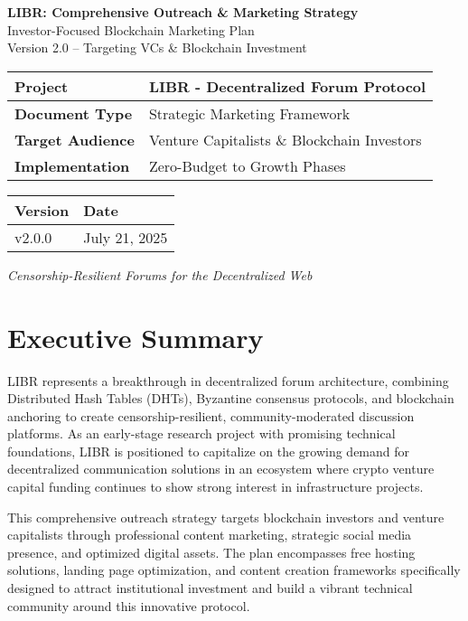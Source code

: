 \documentclass[12pt,a4paper]{article}
\begin{document}
\begin{titlepage}
\centering
\vspace*{2cm}
{\Huge\textbf{LIBR: Comprehensive Outreach \& Marketing Strategy}}\\[0.5cm]
{\Large Investor-Focused Blockchain Marketing Plan}\\[1cm]
{\large Version 2.0 -- Targeting VCs \& Blockchain Investment}\\[2cm]

\begin{tabular}{|l|l|}
\hline
\textbf{Project} & LIBR - Decentralized Forum Protocol \\
\hline
\textbf{Document Type} & Strategic Marketing Framework \\
\hline
\textbf{Target Audience} & Venture Capitalists \& Blockchain Investors \\
\hline
\textbf{Implementation} & Zero-Budget to Growth Phases \\
\hline
\end{tabular}

\vspace{10mm}

\begin{tabular}{|l|l|}
\hline
\textbf{Version} & \textbf{Date} \\
\hline
v2.0.0 & July 21, 2025 \\
\hline
\end{tabular}

\vfill
{\large\textit{Censorship-Resilient Forums for the Decentralized Web}}
\end{titlepage}

\tableofcontents
\newpage

\section{Executive Summary}

LIBR represents a breakthrough in decentralized forum architecture, combining Distributed Hash Tables (DHTs), Byzantine consensus protocols, and blockchain anchoring to create censorship-resilient, community-moderated discussion platforms. As an early-stage research project with promising technical foundations, LIBR is positioned to capitalize on the growing demand for decentralized communication solutions in an ecosystem where crypto venture capital funding continues to show strong interest in infrastructure projects.

This comprehensive outreach strategy targets blockchain investors and venture capitalists through professional content marketing, strategic social media presence, and optimized digital assets. The plan encompasses free hosting solutions, landing page optimization, and content creation frameworks specifically designed to attract institutional investment and build a vibrant technical community around this innovative protocol.
\end{document}

